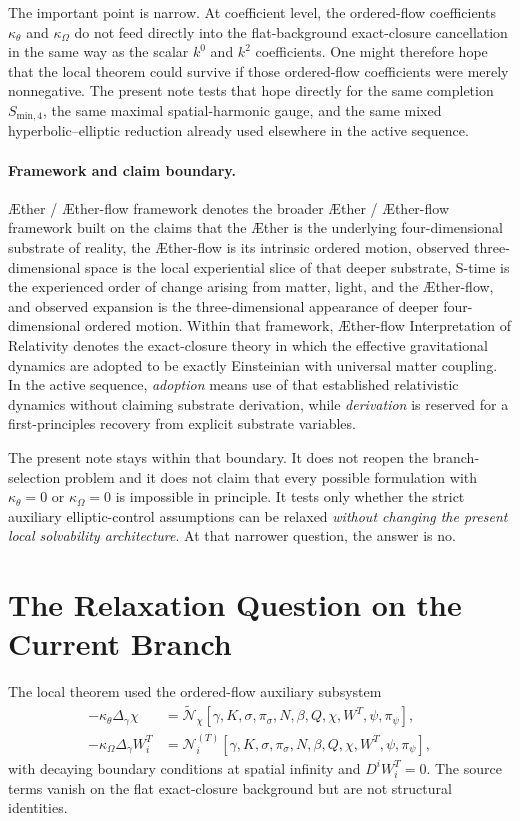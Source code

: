\documentclass[11pt]{article}
\newcommand{\Aether}{\AE{}ther}
\newcommand{\Aflow}{\AE{}ther-flow}
\newcommand{\TheoryName}{\Aflow{} Interpretation of Relativity}
\newcommand{\TheoryProgram}{\Aether{} / \Aflow{} framework}
\begin{document}
The important point is narrow. At coefficient level, the ordered-flow coefficients \(\kappa_\theta\) and \(\kappa_\Omega\) do not feed directly into the flat-background exact-closure cancellation in the same way as the scalar \(k^0\) and \(k^2\) coefficients. One might therefore hope that the local theorem could survive if those ordered-flow coefficients were merely nonnegative. The present note tests that hope directly for the same completion \(S_{\mathrm{min},4}\), the same maximal spatial-harmonic gauge, and the same mixed hyperbolic--elliptic reduction already used elsewhere in the active sequence.

\paragraph{Framework and claim boundary.}
\TheoryProgram{} denotes the broader \Aether{} / \Aflow{} framework built on the claims that the \Aether{} is the underlying four-dimensional substrate of reality, the \Aflow{} is its intrinsic ordered motion, observed three-dimensional space is the local experiential slice of that deeper substrate, S-time is the experienced order of change arising from matter, light, and the \Aflow{}, and observed expansion is the three-dimensional appearance of deeper four-dimensional ordered motion. Within that framework, \TheoryName{} denotes the exact-closure theory in which the effective gravitational dynamics are adopted to be exactly Einsteinian with universal matter coupling. In the active sequence, \emph{adoption} means use of that established relativistic dynamics without claiming substrate derivation, while \emph{derivation} is reserved for a first-principles recovery from explicit substrate variables.

The present note stays within that boundary. It does not reopen the branch-selection problem and it does not claim that every possible formulation with \(\kappa_\theta=0\) or \(\kappa_\Omega=0\) is impossible in principle. It tests only whether the strict auxiliary elliptic-control assumptions can be relaxed \emph{without changing the present local solvability architecture}. At that narrower question, the answer is no.

\section{The Relaxation Question on the Current Branch}

The local theorem used the ordered-flow auxiliary subsystem
\begin{align}
-\kappa_\theta\Delta_\gamma\chi
&=
\widetilde{\mathcal N}_\chi[\gamma,K,\sigma,\pi_\sigma,N,\beta,Q,\chi,W^T,\psi,\pi_\psi],
\label{eq:chi}
\\
-\kappa_\Omega\Delta_\gamma W_i^T
&=
\mathcal N_i^{(T)}[\gamma,K,\sigma,\pi_\sigma,N,\beta,Q,\chi,W^T,\psi,\pi_\psi],
\label{eq:WT}
\end{align}
with decaying boundary conditions at spatial infinity and \(D^iW_i^T=0\). The source terms vanish on the flat exact-closure background but are not structural identities.
\end{document}
